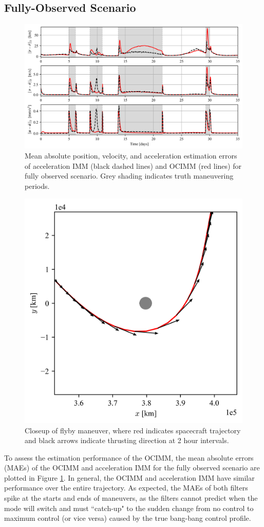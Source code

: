 \documentclass[letterpaper, preprint, paper,11pt]{AAS}	%
\begin{document}
\subsection{Fully-Observed Scenario}

\begin{figure}
    \centering
    \includegraphics[width=1\linewidth]{Figures/MAE_normal.png}
    \caption{Mean absolute position, velocity, and acceleration estimation errors of acceleration IMM (black dashed lines) and OCIMM (red lines) for fully observed scenario. Grey shading indicates truth maneuvering periods.}
    \label{fig:MAE-normal}
\end{figure}

\begin{figure}
    \centering
    \includegraphics[width=0.4\linewidth]{Figures/closeup.png}
    \caption{Closeup of flyby maneuver, where red indicates spacecraft trajectory and black arrows indicate thrusting direction at 2 hour intervals.}
    \label{fig:closeup}
\end{figure}

To assess the estimation performance of the OCIMM, the mean absolute errors (MAEs) of  the OCIMM and acceleration IMM for the fully observed scenario are plotted in Figure \ref{fig:MAE-normal}. In general, the OCIMM and acceleration IMM have similar performance over the entire trajectory. As expected, the MAEs of both filters spike at the starts and ends of maneuvers, as the filters cannot predict when the mode will switch and must ``catch-up" to the sudden change from no control to maximum control (or vice versa) caused by the true bang-bang control profile.
\end{document}
